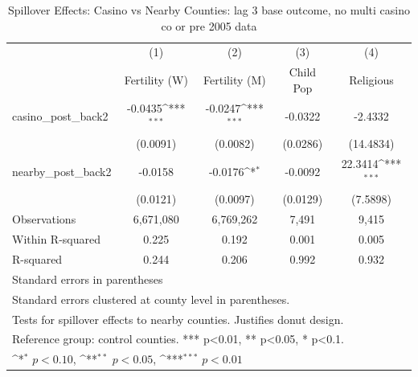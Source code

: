 \begin{table}[htbp]\centering
\def\sym#1{\ifmmode^{#1}\else\(^{#1}\)\fi}
\caption{Spillover Effects: Casino vs Nearby Counties: lag 3 base outcome, no multi casino co or pre 2005 data}
\begin{tabular}{l*{4}{c}}
\hline\hline
            &\multicolumn{1}{c}{(1)}&\multicolumn{1}{c}{(2)}&\multicolumn{1}{c}{(3)}&\multicolumn{1}{c}{(4)}\\
            &\multicolumn{1}{c}{Fertility (W)}&\multicolumn{1}{c}{Fertility (M)}&\multicolumn{1}{c}{Child Pop}&\multicolumn{1}{c}{Religious}\\
\hline
casino\_post\_back2&     -0.0435\sym{***}&     -0.0247\sym{***}&     -0.0322         &     -2.4332         \\
            &    (0.0091)         &    (0.0082)         &    (0.0286)         &   (14.4834)         \\
[1em]
nearby\_post\_back2&     -0.0158         &     -0.0176\sym{*}  &     -0.0092         &     22.3414\sym{***}\\
            &    (0.0121)         &    (0.0097)         &    (0.0129)         &    (7.5898)         \\
\hline
Observations&   6,671,080         &   6,769,262         &       7,491         &       9,415         \\
Within R-squared&       0.225         &       0.192         &       0.001         &       0.005         \\
R-squared   &       0.244         &       0.206         &       0.992         &       0.932         \\
\hline\hline
\multicolumn{5}{l}{\footnotesize Standard errors in parentheses}\\
\multicolumn{5}{l}{\footnotesize Standard errors clustered at county level in parentheses.}\\
\multicolumn{5}{l}{\footnotesize Tests for spillover effects to nearby counties. Justifies donut design.}\\
\multicolumn{5}{l}{\footnotesize Reference group: control counties. *** p<0.01, ** p<0.05, * p<0.1.}\\
\multicolumn{5}{l}{\footnotesize \sym{*} \(p<0.10\), \sym{**} \(p<0.05\), \sym{***} \(p<0.01\)}\\
\end{tabular}
\end{table}
